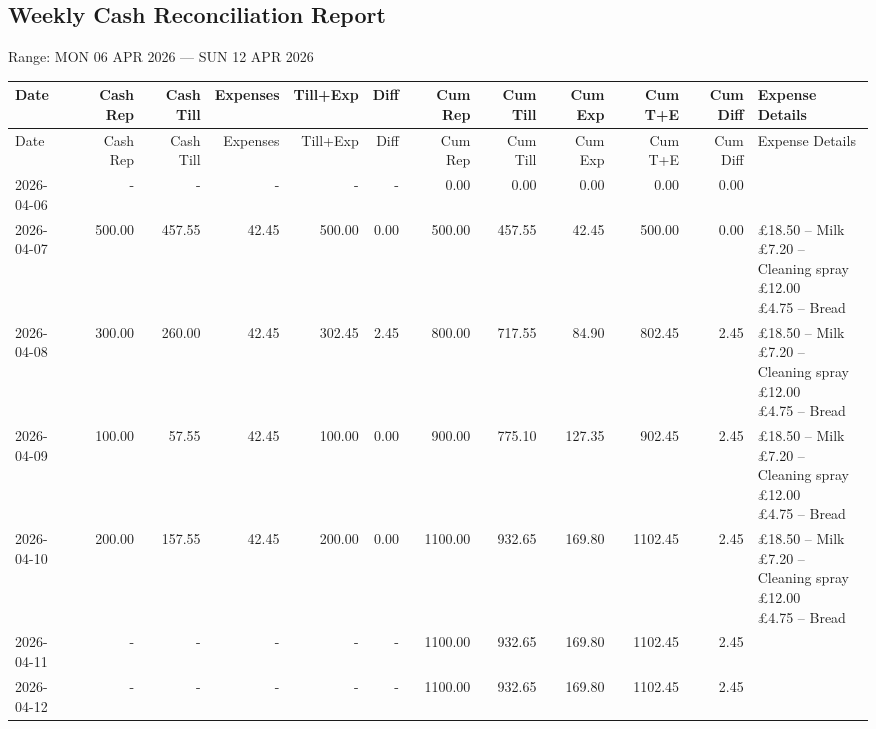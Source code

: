 \documentclass[11pt]{article}
\begin{document}
\begin{landscape}

\section*{Weekly Cash Reconciliation Report}
\noindent
Range: MON 06 APR 2026 --- SUN 12 APR 2026

\bigskip

\footnotesize
\setlength{\LTleft}{0pt}
\setlength{\LTright}{0pt}

\begin{longtable}{p{3.2cm} r r r r r| r r r r r p{5.8cm}}
\toprule
Date & Cash Rep & Cash Till & Expenses & Till+Exp & Diff & Cum Rep & Cum Till & Cum Exp & Cum T+E & Cum Diff & Expense Details \\
\midrule
\endfirsthead

\toprule
Date & Cash Rep & Cash Till & Expenses & Till+Exp & Diff & Cum Rep & Cum Till & Cum Exp & Cum T+E & Cum Diff & Expense Details \\
\midrule
\endhead

\bottomrule
\endfoot

2026-04-06 & - & - & - & - & - & 0.00 & 0.00 & 0.00 & 0.00 & 0.00 &  \\ \hline
2026-04-07 & 500.00 & 457.55 & 42.45 & 500.00 & 0.00 & 500.00 & 457.55 & 42.45 & 500.00 & 0.00 & \makecell[l]{\pounds 18.50 -- Milk \\ \pounds 7.20 -- Cleaning spray \\ \pounds 12.00 \\ \pounds 4.75 -- Bread} \\ \hline
2026-04-08 & 300.00 & 260.00 & 42.45 & 302.45 & 2.45 & 800.00 & 717.55 & 84.90 & 802.45 & 2.45 & \makecell[l]{\pounds 18.50 -- Milk \\ \pounds 7.20 -- Cleaning spray \\ \pounds 12.00 \\ \pounds 4.75 -- Bread} \\ \hline
2026-04-09 & 100.00 & 57.55 & 42.45 & 100.00 & 0.00 & 900.00 & 775.10 & 127.35 & 902.45 & 2.45 & \makecell[l]{\pounds 18.50 -- Milk \\ \pounds 7.20 -- Cleaning spray \\ \pounds 12.00 \\ \pounds 4.75 -- Bread} \\ \hline
2026-04-10 & 200.00 & 157.55 & 42.45 & 200.00 & 0.00 & 1100.00 & 932.65 & 169.80 & 1102.45 & 2.45 & \makecell[l]{\pounds 18.50 -- Milk \\ \pounds 7.20 -- Cleaning spray \\ \pounds 12.00 \\ \pounds 4.75 -- Bread} \\ \hline
2026-04-11 & - & - & - & - & - & 1100.00 & 932.65 & 169.80 & 1102.45 & 2.45 &  \\ \hline
2026-04-12 & - & - & - & - & - & 1100.00 & 932.65 & 169.80 & 1102.45 & 2.45 &  \\ \hline
\end{longtable}

\end{landscape}
\end{document}
